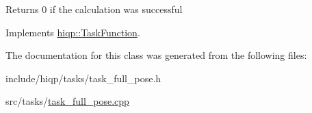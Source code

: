 \begin{DoxyReturn}{Returns}
0 if the calculation was successful 
\end{DoxyReturn}


Implements \hyperlink{classhiqp_1_1TaskFunction_a47a3283a0c0ebafa17feeca96afe5af0}{hiqp\-::\-Task\-Function}.



The documentation for this class was generated from the following files\-:\begin{DoxyCompactItemize}
\item 
include/hiqp/tasks/task\-\_\-full\-\_\-pose.\-h\item 
src/tasks/\hyperlink{task__full__pose_8cpp}{task\-\_\-full\-\_\-pose.\-cpp}\end{DoxyCompactItemize}
